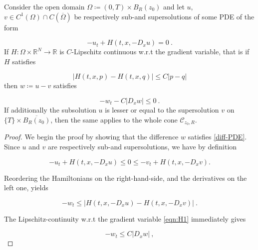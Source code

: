 \begin{theorem}
			\label{smooth_loc} 
			Consider the open domain $ \Omega \coloneqq \left( 0, T \right) \times B_R(z_0) $ and let $ u $, $ v \in C^{1}(\Omega) \cap C(\overline{\Omega}) $ be respectively sub-and supersolutions of some PDE of the form
			
			\begin{equation*}
				-u_t + H(t, x, -D_x u) = 0 \ .
			\end{equation*}
			If $ H : \Omega \times \mathbb{R}^{N} \to \mathbb{R} $ is $ C $-Lipschitz continuous w.r.t the gradient variable, that is if $ H $ satisfies
			
			\begin{equation}
				\tag{H1}
				\lvert H(t, x, p) - H(t, x, q) \rvert \leq C \lvert p - q \rvert
				\label{eqn:H1}
			\end{equation}
			then $ w \coloneqq u - v $ satisfies
			
			\begin{equation}
				\label{diff-PDE}
				-w_t - C \lvert D_x w \rvert \leq 0 \ .
			\end{equation}
			If additionally the subsolution $ u $ is lesser or equal to the supersolution $ v $ on $ \{ T \} \times \overline{B_R(z_0)} $, then the same applies to the whole cone $ \mathcal{C}_{z_0, R} $.
			
			\begin{proof}
				We begin the proof by showing that the difference $ w $ satisfies \ref{diff-PDE}. Since $ u $ and $ v $ are respectively sub-and supersolutions, we have by definition
				
				\begin{equation*}
					-u_t + H(t, x, -D_x u) \leq 0 \leq -v_t + H(t, x, -D_x v) .
				\end{equation*}
				
				Reordering the Hamiltonians on the right-hand-side, and the derivatives on the left one, yields
				
				\begin{equation*}
					-w_t \leq \lvert H(t, x, -D_x u) - H(t, x, -D_x v) \rvert \ .
				\end{equation*}
				
				The Lipschitz-continuity w.r.t the gradient variable \eqref{eqn:H1} immediately gives
				
				\begin{equation*}
					-w_t \leq C \lvert D_x w \rvert \ ,
				\end{equation*}
				

\end{proof}
\end{theorem}
